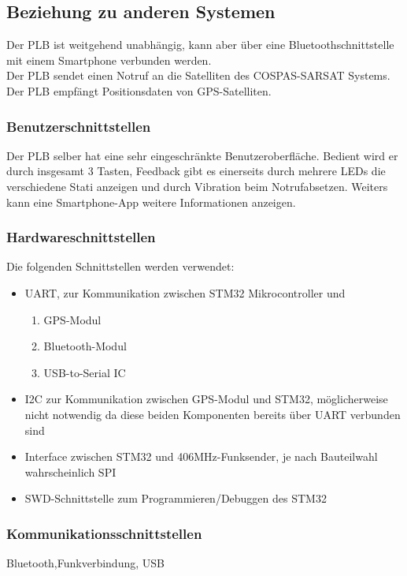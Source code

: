 \subsection{Beziehung zu anderen Systemen}
Der PLB ist weitgehend unabhängig, kann aber über eine Bluetoothschnittstelle mit einem Smartphone verbunden werden.\\
Der PLB sendet einen Notruf an die Satelliten des COSPAS-SARSAT Systems.\\
Der PLB empfängt Positionsdaten von GPS-Satelliten.


\subsubsection{Benutzerschnittstellen}
Der PLB selber hat eine sehr eingeschränkte Benutzeroberfläche. Bedient wird er durch insgesamt 3 Tasten, Feedback gibt es einerseits durch mehrere LEDs die verschiedene Stati anzeigen und durch Vibration beim Notrufabsetzen. Weiters kann eine Smartphone-App weitere Informationen anzeigen. \\[-0.3cm]

\subsubsection{Hardwareschnittstellen}
Die folgenden Schnittstellen werden verwendet:
\begin{itemize}
\item UART, zur Kommunikation zwischen STM32 Mikrocontroller und 
	\begin{enumerate}
	\item GPS-Modul
	\item Bluetooth-Modul 
	\item USB-to-Serial IC 
\end{enumerate}
\item I2C zur Kommunikation zwischen GPS-Modul und STM32, möglicherweise nicht notwendig da diese beiden Komponenten bereits über UART verbunden sind
\item Interface zwischen STM32 und 406MHz-Funksender, je nach Bauteilwahl wahrscheinlich SPI
\item SWD-Schnittstelle zum Programmieren/Debuggen des STM32
\end{itemize}

\subsubsection{Kommunikationsschnittstellen}
Bluetooth,Funkverbindung, USB

